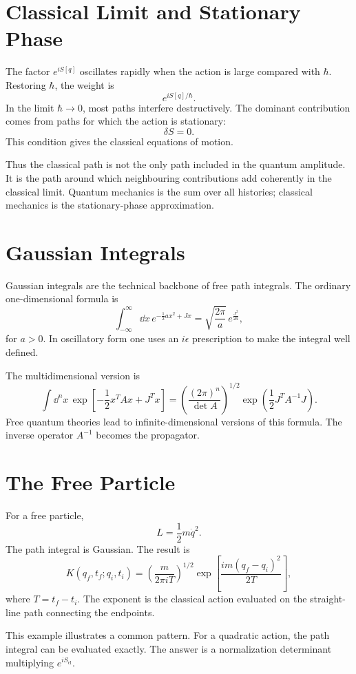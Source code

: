 \section{Classical Limit and Stationary Phase}

The factor \(e^{iS[q]}\) oscillates rapidly when the action is large compared
with \(\hbar\). Restoring \(\hbar\), the weight is
\[
    e^{iS[q]/\hbar}.
\]
In the limit \(\hbar\to0\), most paths interfere destructively. The dominant
contribution comes from paths for which the action is stationary:
\[
    \delta S=0.
\]
This condition gives the classical equations of motion.

Thus the classical path is not the only path included in the quantum amplitude.
It is the path around which neighbouring contributions add coherently in the
classical limit. Quantum mechanics is the sum over all histories; classical
mechanics is the stationary-phase approximation.

\section{Gaussian Integrals}

Gaussian integrals are the technical backbone of free path integrals. The
ordinary one-dimensional formula is
\[
    \int_{-\infty}^{\infty}\dd x\,
    e^{-\frac{1}{2}ax^2+Jx}
    = \sqrt{\frac{2\pi}{a}}\,
      e^{\frac{J^2}{2a}},
\]
for \(a>0\). In oscillatory form one uses an \(i\epsilon\) prescription to make
the integral well defined.

The multidimensional version is
\[
    \int \dd^n x\,
    \exp\left[-\frac{1}{2}x^TAx+J^Tx\right]
    = \left(\frac{(2\pi)^n}{\det A}\right)^{1/2}
      \exp\left(\frac{1}{2}J^TA^{-1}J\right).
\]
Free quantum theories lead to infinite-dimensional versions of this formula.
The inverse operator \(A^{-1}\) becomes the propagator.

\section{The Free Particle}

For a free particle,
\[
    L=\frac{1}{2}m\dot q^2.
\]
The path integral is Gaussian. The result is
\[
    K(q_f,t_f;q_i,t_i)
    = \left(\frac{m}{2\pi iT}\right)^{1/2}
      \exp\left[\frac{im(q_f-q_i)^2}{2T}\right],
\]
where \(T=t_f-t_i\). The exponent is the classical action evaluated on the
straight-line path connecting the endpoints.

This example illustrates a common pattern. For a quadratic action, the path
integral can be evaluated exactly. The answer is a normalization determinant
multiplying \(e^{iS_{\mathrm{cl}}}\).


